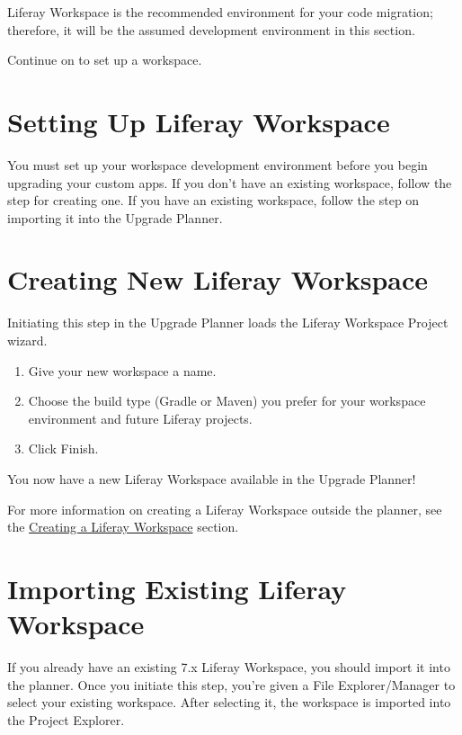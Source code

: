 Liferay Workspace is the recommended environment for your code
migration; therefore, it will be the assumed development environment in
this section.

Continue on to set up a workspace.

\section{Setting Up Liferay
Workspace}\label{setting-up-liferay-workspace}

You must set up your workspace development environment before you begin
upgrading your custom apps. If you don't have an existing workspace,
follow the step for creating one. If you have an existing workspace,
follow the step on importing it into the Upgrade Planner.

\section{Creating New Liferay
Workspace}\label{creating-new-liferay-workspace}

Initiating this step in the Upgrade Planner loads the Liferay Workspace
Project wizard.

\begin{enumerate}
\def\labelenumi{\arabic{enumi}.}
\item
  Give your new workspace a name.
\item
  Choose the build type (Gradle or Maven) you prefer for your workspace
  environment and future Liferay projects.
\item
  Click Finish.
\end{enumerate}

You now have a new Liferay Workspace available in the Upgrade Planner!

For more information on creating a Liferay Workspace outside the
planner, see the
\href{/docs/7-2/reference/-/knowledge_base/r/creating-a-liferay-workspace}{Creating
a Liferay Workspace} section.

\section{Importing Existing Liferay
Workspace}\label{importing-existing-liferay-workspace}

If you already have an existing 7.x Liferay Workspace, you should import
it into the planner. Once you initiate this step, you're given a File
Explorer/Manager to select your existing workspace. After selecting it,
the workspace is imported into the Project Explorer.


